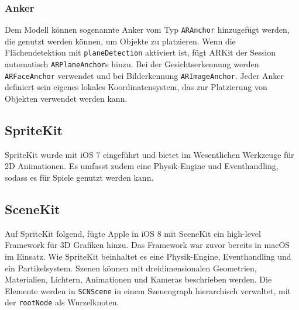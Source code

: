 
\subsubsection{Anker}
Dem Modell können sogenannte Anker vom Typ \texttt{ARAnchor} hinzugefügt werden, die genutzt werden können, um Objekte zu platzieren. Wenn die Flächendetektion mit \texttt{planeDetection} aktiviert ist, fügt ARKit der Session automatisch \texttt{ARPlaneAnchor}s hinzu. Bei der Gesichtserkennung werden \texttt{ARFaceAnchor} verwendet und bei Bilderkennung \texttt{ARImageAnchor}. Jeder Anker definiert sein eigenes lokales Koordinatensystem, das zur Platzierung von Objekten verwendet werden kann.


\subsection{SpriteKit}
SpriteKit wurde mit iOS 7 eingeführt und bietet im Wesentlichen Werkzeuge für 2D Animationen. Es umfasst zudem eine Physik-Engine und Eventhandling, sodass es für Spiele genutzt werden kann.


\subsection{SceneKit}
Auf SpriteKit folgend, fügte Apple in iOS 8 mit SceneKit ein high-level Framework für 3D Grafiken hinzu. Das Framework war zuvor bereits in macOS im Einsatz. Wie SpriteKit beinhaltet es eine Physik-Engine, Eventhandling und ein Partikelsystem. Szenen können mit dreidimensionalen Geometrien, Materialien, Lichtern, Animationen und Kameras beschrieben werden. Die Elemente werden in \texttt{SCNScene} in einem Szenengraph hierarchisch verwaltet, mit der \texttt{rootNode} als Wurzelknoten.

